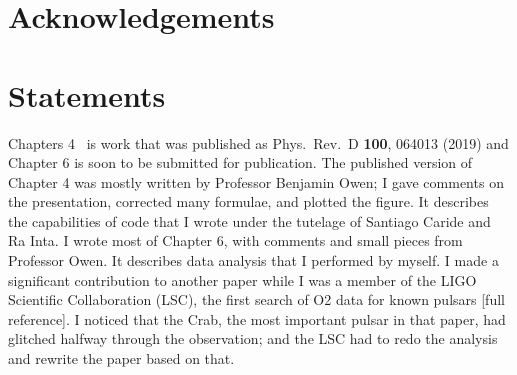 \documentclass{ttuthes2007}
\begin{document}
\frontmatter


\chapter{\textbf{Acknowledgements}}

 

\newpage
\chapter{Statements}
Chapters 4~\cite{PhysRevD.100.064013} is work that was published as Phys.\ Rev.\
D \textbf{100}, 064013 (2019) and Chapter 6 is soon to be submitted for publication. The published version
of Chapter 4 was mostly written by Professor Benjamin Owen; I gave comments on
the presentation, corrected many formulae, and plotted the figure. It describes
the capabilities of code that I wrote under the tutelage of Santiago Caride and
Ra Inta. I wrote most of Chapter 6, with comments and small pieces from
Professor Owen. It describes data analysis that I performed by myself. I made a
significant contribution to another paper while I was a member of the LIGO
Scientific Collaboration (LSC), the first search of O2 data for known pulsars
[full reference]. I noticed that the Crab, the most important pulsar in that
paper, had glitched halfway through the observation; and the LSC had to redo the
analysis and rewrite the paper based on that.

\tableofcontents	%
\end{document}
